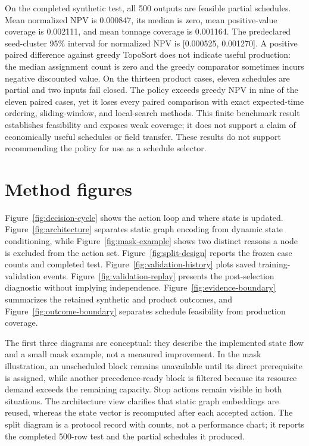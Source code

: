 \documentclass[11pt]{article}
\begin{document}
On the completed synthetic test, all 500 outputs are feasible partial schedules. Mean normalized NPV is 0.000847, its median is zero, mean positive-value coverage is 0.002111, and mean tonnage coverage is 0.001164. The predeclared seed-cluster 95\% interval for normalized NPV is [0.000525, 0.001270]. A positive paired difference against greedy TopoSort does not indicate useful production: the median assignment count is zero and the greedy comparator sometimes incurs negative discounted value. On the thirteen product cases, eleven schedules are partial and two inputs fail closed. The policy exceeds greedy NPV in nine of the eleven paired cases, yet it loses every paired comparison with exact expected-time ordering, sliding-window, and local-search methods. This finite benchmark result establishes feasibility and exposes weak coverage; it does not support a claim of economically useful schedules or field transfer. These results do not support recommending the policy for use as a schedule selector.

\section*{Method figures}
Figure~\ref{fig:decision-cycle} shows the action loop and where state is updated. Figure~\ref{fig:architecture} separates static graph encoding from dynamic state conditioning, while Figure~\ref{fig:mask-example} shows two distinct reasons a node is excluded from the action set. Figure~\ref{fig:split-design} reports the frozen case counts and completed test. Figure~\ref{fig:validation-history} plots saved training-validation events. Figure~\ref{fig:validation-replay} presents the post-selection diagnostic without implying independence. Figure~\ref{fig:evidence-boundary} summarizes the retained synthetic and product outcomes, and Figure~\ref{fig:outcome-boundary} separates schedule feasibility from production coverage.

The first three diagrams are conceptual: they describe the implemented state flow and a small mask example, not a measured improvement. In the mask illustration, an unscheduled block remains unavailable until its direct prerequisite is assigned, while another precedence-ready block is filtered because its resource demand exceeds the remaining capacity. Stop actions remain visible in both situations. The architecture view clarifies that static graph embeddings are reused, whereas the state vector is recomputed after each accepted action. The split diagram is a protocol record with counts, not a performance chart; it reports the completed 500-row test and the partial schedules it produced.
\end{document}

